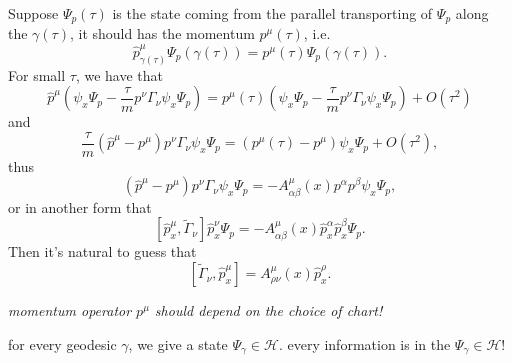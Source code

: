 \documentclass[12pt]{article}
\theoremstyle{definition}
\theoremstyle{plain}
\begin{document}
Suppose $\Psi_{p}(\tau)$ is the state coming from the parallel transporting of $\Psi_{p}$ along the $\gamma(\tau)$, it should has the momentum $p^\mu(\tau)$, i.e.
\[
	\hat p^\mu_{\gamma(\tau)}\Psi_p(\gamma(\tau))=p^\mu(\tau)\Psi_p(\gamma(\tau)).
\]
For small $\tau$, we have that
\[
	\hat p^\mu
	\left(
		\psi_{x}\Psi_p-\frac \tau m p^\nu\Gamma_{\nu}\psi_{x}\Psi_p
	\right)
	=p^\mu(\tau)
	\left(
		\psi_{x}\Psi_p-\frac \tau m p^\nu\Gamma_{\nu}\psi_{x}\Psi_p
	\right)
	+O(\tau^2)
\]
and
\[
	\frac \tau m (\hat p^\mu-p^\mu )p^\nu\Gamma_{\nu}\psi_{x}\Psi_p=(p^\mu(\tau)-p^\mu )\psi_{x}\Psi_p+O(\tau^2),
\]
thus
\[
	(\hat p^\mu-p^\mu )p^\nu\Gamma_{\nu}\psi_{x}\Psi_p=-A^\mu_{\alpha\beta}(x)p^\alpha p^\beta \psi_{x}\Psi_p,
\]
or in another form that
\[
	[\hat p^\mu_x,\widetilde{\Gamma}_{\nu}]\hat p^\nu_x\Psi_p=-A^\mu_{\alpha\beta}(x)\hat p_x^\alpha \hat p_x^\beta \Psi_p.
\]
Then it's natural to guess that
\[
	[\widetilde{\Gamma}_{\nu},\hat p^\mu_x]=A^\mu_{\rho\nu}(x)\hat p_x^\rho.
\]

\textit{momentum operator $p^\mu$ should depend on the choice of chart!}



for every geodesic $\gamma$, we give a state $\Psi_\gamma\in \mathcal H$. every information is in the $\Psi_\gamma\in \mathcal H$!
\end{document}
